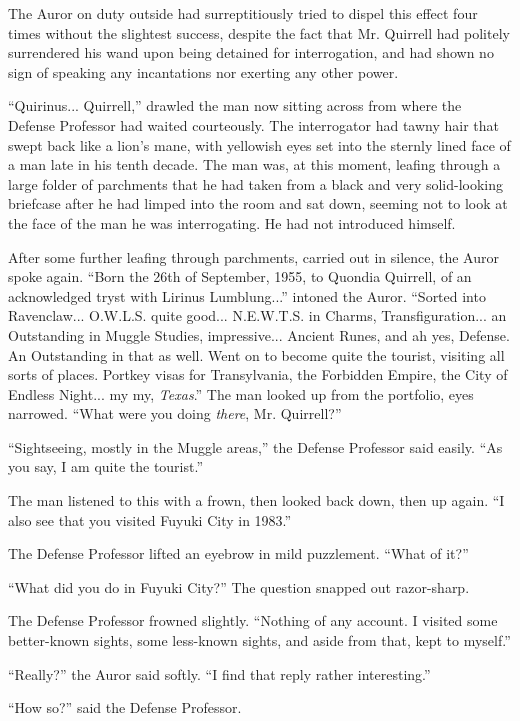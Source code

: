 The Auror on duty outside had surreptitiously tried to dispel this effect four times without the slightest success, despite the fact that Mr. Quirrell had politely surrendered his wand upon being detained for interrogation, and had shown no sign of speaking any incantations nor exerting any other power.

``Quirinus... Quirrell,'' drawled the man now sitting across from where the Defense Professor had waited courteously. The interrogator had tawny hair that swept back like a lion's mane, with yellowish eyes set into the sternly lined face of a man late in his tenth decade. The man was, at this moment, leafing through a large folder of parchments that he had taken from a black and very solid-looking briefcase after he had limped into the room and sat down, seeming not to look at the face of the man he was interrogating. He had not introduced himself.

After some further leafing through parchments, carried out in silence, the Auror spoke again. ``Born the 26th of September, 1955, to Quondia Quirrell, of an acknowledged tryst with Lirinus Lumblung...'' intoned the Auror. ``Sorted into Ravenclaw... O.W.L.S. quite good... N.E.W.T.S. in Charms, Transfiguration... an Outstanding in Muggle Studies, impressive... Ancient Runes, and ah yes, Defense. An Outstanding in that as well. Went on to become quite the tourist, visiting all sorts of places. Portkey visas for Transylvania, the Forbidden Empire, the City of Endless Night... my my, \emph{Texas}.'' The man looked up from the portfolio, eyes narrowed. ``What were you doing \emph{there}, Mr. Quirrell?''

``Sightseeing, mostly in the Muggle areas,'' the Defense Professor said easily. ``As you say, I am quite the tourist.''

The man listened to this with a frown, then looked back down, then up again. ``I also see that you visited Fuyuki City in 1983.''

The Defense Professor lifted an eyebrow in mild puzzlement. ``What of it?''

``What did you do in Fuyuki City?'' The question snapped out razor-sharp.

The Defense Professor frowned slightly. ``Nothing of any account. I visited some better-known sights, some less-known sights, and aside from that, kept to myself.''

``Really?'' the Auror said softly. ``I find that reply rather interesting.''

``How so?'' said the Defense Professor.

